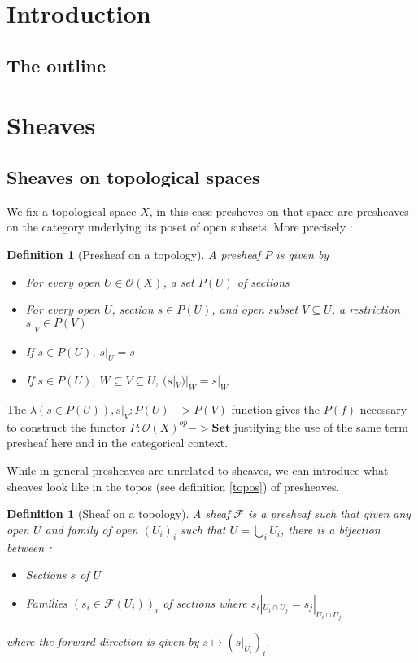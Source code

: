 \documentclass[11pt]{article}
\newtheorem{definition}[theorem]{Definition}
\newcommand{\0}{\mathbf{0}}
\newcommand{\1}{\mathbf{1}}
\begin{document}
\section{Introduction}




\subsection{The outline}

\section{Sheaves}

\subsection{Sheaves on topological spaces}

We fix a topological space $X$, in this case presheves on that space are presheaves on the category underlying its poset of open subsets. More precisely :

\begin{definition}[Presheaf on a topology]
    A \emph{presheaf} $P$ is given by
    \begin{itemize}
        \item For every open $U \in \mathcal{O}(X)$, a set $P(U)$ of \emph{sections}
        \item For every open $U$, section $s\in P(U)$, and open subset $V\subseteq U$, a \emph{restriction} $s|_V\in P(V)$
        \item If $s\in P(U)$, $s|_U = s$
        \item If $s\in P(U)$, $W\subseteq V \subseteq U$, $(s|_V)|_W = s|_W$
    \end{itemize}
\end{definition}
The $\lambda (s\in P(U)), s|_V : P(U) -> P(V)$ function gives the $P(f)$ necessary to construct the functor $P : \mathcal{O}(X)^{op} -> \mathbf{Set}$ justifying the use of the same term presheaf here and in the categorical context.

While in general presheaves are unrelated to sheaves, we can introduce what sheaves look like in the topos (see definition \ref{topos}) of presheaves.

\begin{definition}[Sheaf on a topology]
    A \emph{sheaf} $\mathcal{F}$ is a presheaf such that given any open  $U$ and family of open $(U_i)_i$ such that $U = \bigcup_i U_i$, there is a bijection between :
    \begin{itemize}
        \item Sections $s$ of $U$
        \item Families $(s_i\in \mathcal{F}(U_i))_i$ of sections where $s_i|_{U_i\cap U_j} = s_j|_{U_i\cap U_j}$
    \end{itemize}
    where the forward direction is given by $s \mapsto (s|_{U_i})_i$.
\end{definition}
\end{document}
